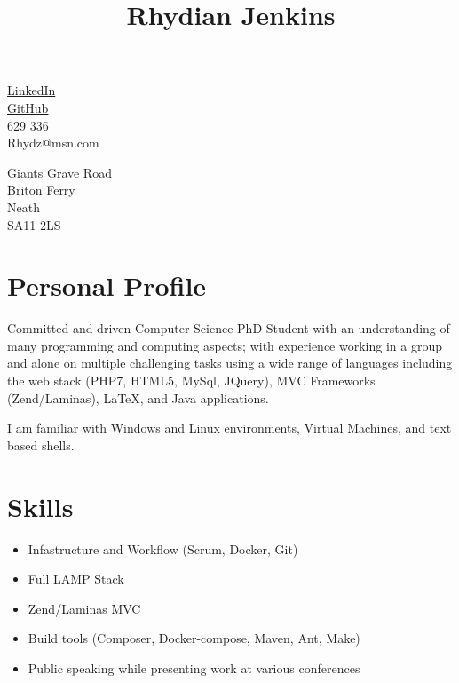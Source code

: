 \documentclass[10pt]{article}
\title{\bfseries\Huge Rhydian Jenkins}
\date{}
\author{}
\begin{document}
\maketitle \vspace{-7em}

\section*{}
\begin{minipage}{0.5\textwidth}
	\faLinkedin \quad \href{https://www.linkedin.com/in/rhydian-jenkins-30309085/}{LinkedIn}\\
	\faGithub \quad \href{https://github.com/RhydianJenkins}{GitHub}\\
	\faPhone {} 629 336\\
	\faEnvelope \quad Rhydz@msn.com
\end{minipage}
\begin{minipage}{0.5\textwidth}
    \begin{flushright}
	Giants Grave Road\\
	Briton Ferry\\
	Neath\\
    SA11 2LS
    \end{flushright}
\end{minipage}

\section*{Personal Profile}
\noindent Committed and driven Computer Science PhD Student with an understanding of many programming and computing aspects; with experience working in a group and alone on multiple challenging tasks using a wide range of languages including the web stack (PHP7, HTML5, MySql, JQuery), MVC Frameworks (Zend/Laminas), \LaTeX, and Java applications.

\noindent I am familiar with Windows and Linux environments, Virtual Machines, and text based shells.

\section*{Skills}
\begin{itemize} \setlength\itemsep{-0.25em}
	\item Infastructure and Workflow (Scrum, Docker, Git)
	\item Full LAMP Stack
	\item Zend/Laminas MVC
	\item Build tools (Composer, Docker-compose, Maven, Ant, Make)
	\item Public speaking while presenting work at various conferences
\end{itemize}
\end{document}
